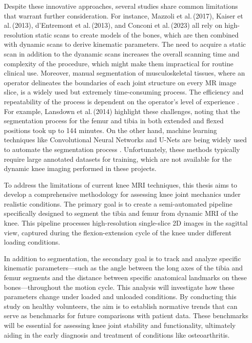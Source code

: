 \documentclass{micro-econ-thesis}
\begin{document}
Despite these innovative approaches, several studies share common limitations that warrant further consideration. For instance, Mazzoli et al.\,(2017), Kaiser et al.\,(2013), d'Entremont et al.\,(2013), and Conconi et al.\,(2023) all rely on high-resolution static scans to create models of the bones, which are then combined with dynamic scans to derive kinematic parameters. The need to acquire a static scan in addition to the dyanamic scans increases the overall scanning time and complexity of the procedure, which might make them impractical for routine clinical use. Moreover, manual segmentation of musculoskeletal tissues, where an operator delineates the boundaries of each joint structure on every MR image slice, is a widely used but extremely time-consuming process. The efficiency and repeatability of the process is dependent on the operator's level of experience \parencite{mcwalter_use_2005}. For example, Lansdown et al.\,(2014) highlight these challenges, noting that the segmentation process for the femur and tibia in both extended and flexed positions took up to 144 minutes. On the other hand, machine learning techniques like Convolutional Neural Networks and U-Nets are being widely used to automate the segmentation process \parencite{liu_deep_2018}. Unfortunately, these methods typically require large annotated datasets for training, which are not available for the dynamic knee imaging performed in these projects.

To address the limitations of current knee MRI techniques, this thesis aims to develop a comprehensive methodology for assessing knee joint mechanics under realistic conditions. The primary goal is to create a semi-automated pipeline specifically designed to segment the tibia and femur from dynamic MRI of the knee. This pipeline processes high-resolution single-slice 2D images in the sagittal view, captured during the flexion-extension cycle of the knee under different loading conditions.

In addition to segmentation, the secondary goal is to track and analyze specific kinematic parameters—such as the angle between the long axes of the tibia and femur segments and the distance between specific anatomical landmarks on these bones—throughout the motion cycle. This analysis will investigate how these parameters change under loaded and unloaded conditions. By conducting this study on healthy volunteers, the aim is to establish normative trends that can serve as benchmarks for future comparisons with patient data. These benchmarks will be essential for assessing knee joint stability and functionality, ultimately aiding in the early diagnosis and treatment of conditions like osteoarthritis.  
\end{document}
